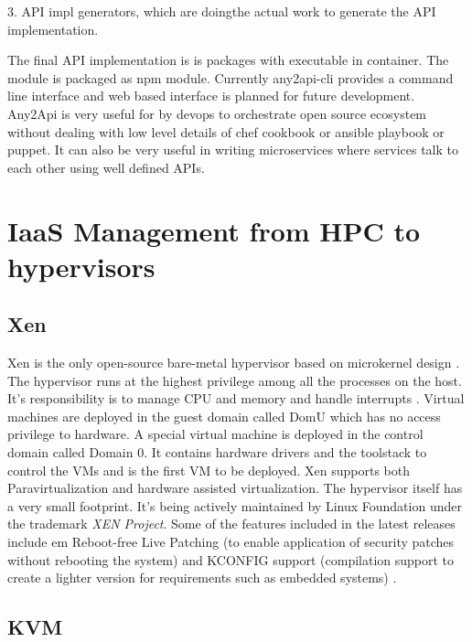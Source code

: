      3. API impl generators, which are doingthe actual work to
        generate the API implementation.

     The final API implementation \cite{www-any2api} is is packages
     with executable in container.  The module is packaged as npm
     module. Currently any2api-cli provides a command line interface
     and web based interface is planned for future
     development. Any2Api is very useful for by devops to orchestrate
     open source ecosystem without dealing with low level details of
     chef cookbook or ansible playbook or puppet. It can also be very
     useful in writing microservices where services talk to each other
     using well defined APIs.

\section{IaaS Management from HPC to hypervisors}

\subsection{ Xen}

     Xen is the only open-source bare-metal hypervisor based on
     microkernel design \cite{www-xen-wikipedia}. The hypervisor runs
     at the highest privilege among all the processes on the
     host. It's responsibility is to manage CPU and memory and handle
     interrupts \cite{www-xen-overview}. Virtual machines are
     deployed in the guest domain called DomU which has no access
     privilege to hardware. A special virtual machine is deployed in
     the control domain called Domain 0. It contains hardware drivers
     and the toolstack to control the VMs and is the first VM to be
     deployed. Xen supports both Paravirtualization and hardware
     assisted virtualization. The hypervisor itself has a very small
     footprint. It's being actively maintained by Linux Foundation
     under the trademark {\em XEN Project}. Some of the features included
     in the latest releases include {em Reboot-free Live Patching} (to
     enable application of security patches without rebooting the
     system) and KCONFIG support (compilation support to create a
     lighter version for requirements such as embedded systems)
     \cite{www-xen-fl}.
          
\subsection{ KVM}

